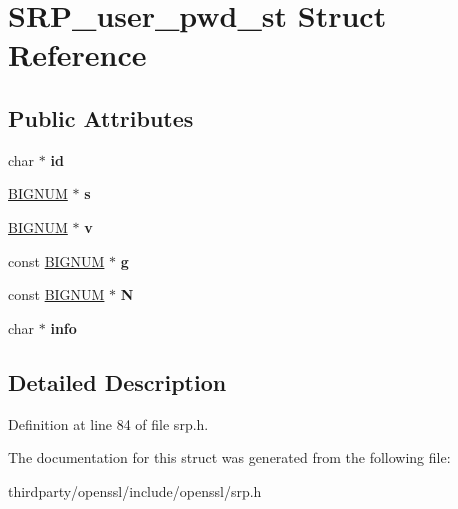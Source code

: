 \hypertarget{struct_s_r_p__user__pwd__st}{}\section{S\+R\+P\+\_\+user\+\_\+pwd\+\_\+st Struct Reference}
\label{struct_s_r_p__user__pwd__st}
\subsection*{Public Attributes}
\begin{DoxyCompactItemize}
\item 
\mbox{\label{struct_s_r_p__user__pwd__st_aac2cd2ebc30d6a9834480589fea69085}} 
char $\ast$ {\bfseries id}
\item 
\mbox{\label{struct_s_r_p__user__pwd__st_a0307e6a70f90139d77f610d6bb956513}} 
\hyperlink{structbignum__st}{B\+I\+G\+N\+UM} $\ast$ {\bfseries s}
\item 
\mbox{\label{struct_s_r_p__user__pwd__st_a2eed7def431386ce2b0a80c7df559529}} 
\hyperlink{structbignum__st}{B\+I\+G\+N\+UM} $\ast$ {\bfseries v}
\item 
\mbox{\label{struct_s_r_p__user__pwd__st_a66e1a6f4c6de6a26791cd9dac942f2bc}} 
const \hyperlink{structbignum__st}{B\+I\+G\+N\+UM} $\ast$ {\bfseries g}
\item 
\mbox{\label{struct_s_r_p__user__pwd__st_a42b7405c1f178f4a7e907cb15fdcf9b8}} 
const \hyperlink{structbignum__st}{B\+I\+G\+N\+UM} $\ast$ {\bfseries N}
\item 
\mbox{\label{struct_s_r_p__user__pwd__st_afcd32dcd1559a02ae11529cbeea3997e}} 
char $\ast$ {\bfseries info}
\end{DoxyCompactItemize}


\subsection{Detailed Description}


Definition at line 84 of file srp.\+h.



The documentation for this struct was generated from the following file\+:\begin{DoxyCompactItemize}
\item 
thirdparty/openssl/include/openssl/srp.\+h\end{DoxyCompactItemize}
